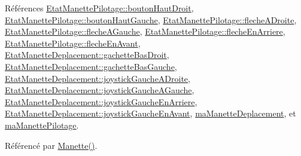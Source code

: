 Références \hyperlink{manette_8h_source_l00157}{Etat\+Manette\+Pilotage\+::bouton\+Haut\+Droit}, \hyperlink{manette_8h_source_l00156}{Etat\+Manette\+Pilotage\+::bouton\+Haut\+Gauche}, \hyperlink{manette_8h_source_l00155}{Etat\+Manette\+Pilotage\+::fleche\+A\+Droite}, \hyperlink{manette_8h_source_l00154}{Etat\+Manette\+Pilotage\+::fleche\+A\+Gauche}, \hyperlink{manette_8h_source_l00153}{Etat\+Manette\+Pilotage\+::fleche\+En\+Arriere}, \hyperlink{manette_8h_source_l00152}{Etat\+Manette\+Pilotage\+::fleche\+En\+Avant}, \hyperlink{manette_8h_source_l00185}{Etat\+Manette\+Deplacement\+::gachette\+Bas\+Droit}, \hyperlink{manette_8h_source_l00184}{Etat\+Manette\+Deplacement\+::gachette\+Bas\+Gauche}, \hyperlink{manette_8h_source_l00183}{Etat\+Manette\+Deplacement\+::joystick\+Gauche\+A\+Droite}, \hyperlink{manette_8h_source_l00182}{Etat\+Manette\+Deplacement\+::joystick\+Gauche\+A\+Gauche}, \hyperlink{manette_8h_source_l00181}{Etat\+Manette\+Deplacement\+::joystick\+Gauche\+En\+Arriere}, \hyperlink{manette_8h_source_l00180}{Etat\+Manette\+Deplacement\+::joystick\+Gauche\+En\+Avant}, \hyperlink{manette_8h_source_l00220}{ma\+Manette\+Deplacement}, et \hyperlink{manette_8h_source_l00246}{ma\+Manette\+Pilotage}.



Référencé par \hyperlink{manette_8cpp_source_l00009}{Manette()}.


